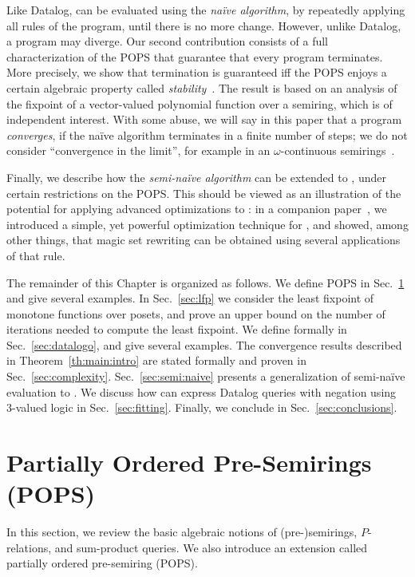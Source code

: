 Like Datalog, \datalogo can be evaluated using the {\em na\"ive algorithm},
by repeatedly applying all rules of the program, until there is no
more change.  However, unlike Datalog, a \datalogo program may diverge.
Our second contribution consists of a full characterization of the
POPS that guarantee that every \datalogo program terminates.  More
precisely, we show that termination is guaranteed iff the POPS enjoys
a certain algebraic property called {\em
  stability}~\cite{semiring_book}.  The result is based on an analysis
of the fixpoint of a vector-valued polynomial function over a semiring, which is of
independent interest.  With some abuse, we will say in this paper that
a \datalogo program {\em converges}, if the na\"ive algorithm terminates
in a finite number of steps; we do not consider ``convergence in the
limit'', for example in an $\omega$-continuous
semirings~\cite{DBLP:conf/pods/GreenKT07,DBLP:journals/jacm/EsparzaKL10}.

Finally, we describe how the {\em semi-na\"ive algorithm} can be
extended to \datalogo, under certain restrictions on the POPS.  This
should be viewed as an illustration of the potential for applying
advanced optimizations to \datalogo: in a companion
paper~\cite{DBLP:conf/sigmod/WangK0PS22}, we introduced a simple, yet
powerful optimization technique for \datalogo, and showed, among other
things, that magic set rewriting can be obtained using several
applications of that rule.

The remainder of this Chapter is organized as follows. 
We define POPS in Sec.~\ref{sec:pops} and give several examples.
In Sec.~\ref{sec:lfp} we consider the least fixpoint of monotone
functions over posets, and prove an upper bound on the number of
iterations needed to compute the least fixpoint.  We define \datalogo
formally in Sec.~\ref{sec:datalogo}, and give several examples.
The convergence results described in Theorem~\ref{th:main:intro} are
stated formally and proven in Sec.~\ref{sec:complexity}.
Sec.~\ref{sec:semi:naive} presents a generalization of semi-na\"ive
evaluation to \datalogo.  We discuss how \datalogo can express Datalog
queries with negation using 3-valued logic in
Sec.~\ref{sec:fitting}.  Finally, we conclude in
Sec.~\ref{sec:conclusions}.

\section{Partially Ordered Pre-Semirings (POPS)}
\label{sec:pops}

In this section, we review the basic algebraic notions of (pre-)semirings,
$P$-relations, and sum-product queries.
We also introduce an extension called partially ordered pre-semiring (POPS).

